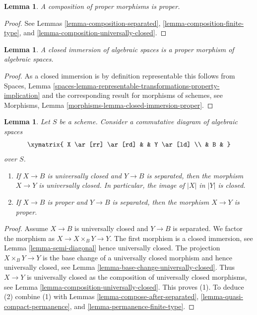 \documentclass{stacks-project}
\theoremstyle{plain}
\newtheorem{lemma}[subsection]{Lemma}
\theoremstyle{definition}
\theoremstyle{remark}
\numberwithin{equation}{subsection}
\begin{document}
\begin{lemma}
\label{lemma-composition-proper}
A composition of proper morphisms is proper.
\end{lemma}

\begin{proof}
See
Lemmas \ref{lemma-composition-separated},
\ref{lemma-composition-finite-type}, and
\ref{lemma-composition-universally-closed}.
\end{proof}

\begin{lemma}
\label{lemma-closed-immersion-proper}
A closed immersion of algebraic spaces is a proper morphism of
algebraic spaces.
\end{lemma}

\begin{proof}
As a closed immersion is by definition representable this follows from
Spaces,
Lemma \ref{spaces-lemma-representable-transformations-property-implication}
and the corresponding result for morphisms of schemes, see
Morphisms, Lemma \ref{morphisms-lemma-closed-immersion-proper}.
\end{proof}

\begin{lemma}
\label{lemma-universally-closed-permanence}
Let $S$ be a scheme.
Consider a commutative diagram of algebraic spaces
$$
\xymatrix{
X \ar[rr] \ar[rd] & &
Y \ar[ld] \\
& B &
}
$$
over $S$.
\begin{enumerate}
\item If $X \to B$ is universally closed and $Y \to B$ is
separated, then the morphism $X \to Y$ is universally closed.
In particular, the image of $|X|$ in $|Y|$ is closed.
\item If $X \to B$ is proper and $Y \to B$ is separated, then
the morphism $X \to Y$ is proper.
\end{enumerate}
\end{lemma}

\begin{proof}
Assume $X \to B$ is universally closed and $Y \to B$ is separated.
We factor the morphism as $X \to X \times_B Y \to Y$.
The first morphism is a closed immersion, see
Lemma \ref{lemma-semi-diagonal}
hence universally closed.
The projection $X \times_B Y \to Y$ is the base change
of a universally closed morphism and hence
universally closed, see
Lemma \ref{lemma-base-change-universally-closed}.
Thus $X \to Y$ is universally closed as the composition
of universally closed morphisms, see
Lemma \ref{lemma-composition-universally-closed}.
This proves (1). To deduce (2) combine (1) with
Lemmas \ref{lemma-compose-after-separated},
\ref{lemma-quasi-compact-permanence}, and
\ref{lemma-permanence-finite-type}.
\end{proof}
\end{document}
